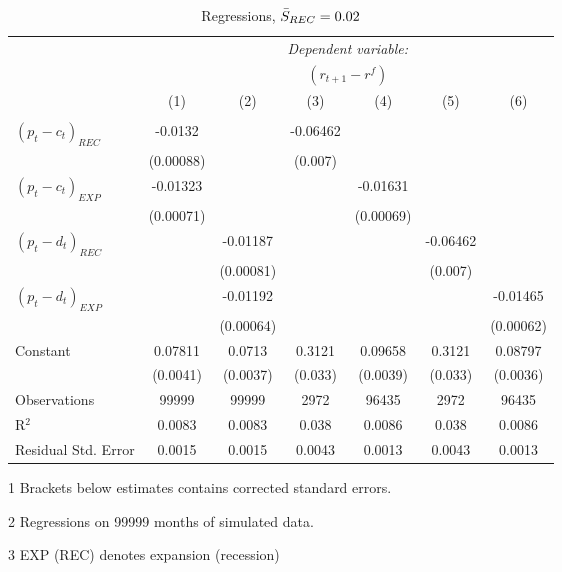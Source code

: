 \begin{table}[H]
\centering   
  \caption{Regressions, $\Bar{S}_{REC} = 0.02$}           
  \label{tab:regress2}     
  \begin{threeparttable}
\begin{tabular}{@{\hspace{5pt}}l@{\hspace{5pt}}cccccc} 
\toprule 
 & \multicolumn{6}{c}{\textit{Dependent variable:}} \\ 
 & \multicolumn{6}{c}{$\left(r_{t+1}-r^f\right)$} \\ 
 \cmidrule(rr){2-7}
 & (1) & (2) & (3) & (4) & (5) & (6) \\ 
\midrule  
\\[-2.1ex] $\left( p_t - c_t \right)_{REC}$ &-0.0132& &-0.06462 & & &\\ 
  & (0.00088) & &(0.007) & & & \\ 
 \addlinespace 
  $\left( p_t - c_t \right)_{EXP}$ &-0.01323  &    & &-0.01631 & &  \\ 
  & (0.00071) & & &(0.00069) & & \\ 
 \addlinespace 
  $\left( p_t - d_t \right)_{REC}$ & &-0.01187& & & -0.06462  &   \\ 
                                   & &  (0.00081) & & & (0.007) &    \\ 
 \addlinespace 
  $\left( p_t - d_t \right)_{EXP}$ & &   -0.01192& & & &-0.01465 \\ 
                                   & &  (0.00064) & & & &(0.00062) \\ 
 \addlinespace 
 Constant &0.07811 &0.0713&0.3121 &0.09658 &0.3121 &0.08797 \\ 
          &(0.0041) &(0.0037)&(0.033)&(0.0039)&(0.033)&(0.0036) \\ 
 \addlinespace 
\midrule  
Observations & 99999 & 99999&2972 & 96435&2972&96435\\
R$^{2}$ &0.0083 & 0.0083&0.038&0.0086&0.038&0.0086 \\ 
Residual Std. Error &0.0015 & 0.0015&0.0043&0.0013&0.0043&0.0013 \\ 
\bottomrule 
\end{tabular} 
\begin{tablenotes}
\footnotesize{
\item[1] Brackets below estimates contains \citet{NW87} corrected standard errors. 
\item[2] Regressions on 99999 months of simulated data.
\item[3] EXP (REC) denotes expansion (recession)
}
\end{tablenotes}
\end{threeparttable}
\end{table} 
